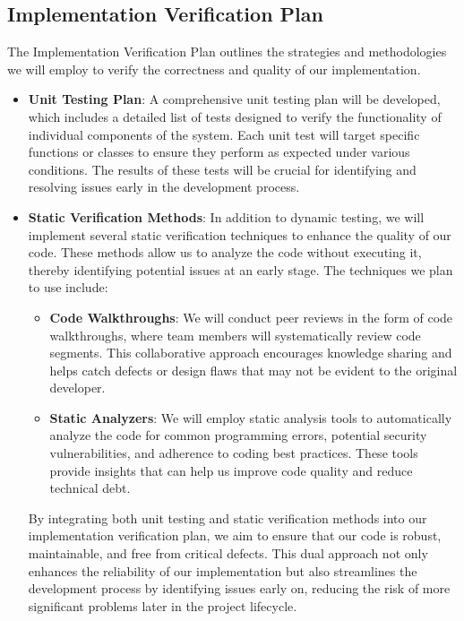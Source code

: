 \documentclass[12pt, titlepage]{article}
\begin{document}
\subsection{Implementation Verification Plan}


The Implementation Verification Plan outlines the strategies and methodologies we will employ to verify the correctness and quality of our implementation.

\begin{itemize}
    \item \textbf{Unit Testing Plan}: A comprehensive unit testing plan will be developed, which includes a detailed list of tests designed to verify the functionality of individual components of the system. Each unit test will target specific functions or classes to ensure they perform as expected under various conditions. The results of these tests will be crucial for identifying and resolving issues early in the development process.

    \item \textbf{Static Verification Methods}: In addition to dynamic testing, we will implement several static verification techniques to enhance the quality of our code. These methods allow us to analyze the code without executing it, thereby identifying potential issues at an early stage. The techniques we plan to use include:
    \begin{itemize}
        \item \textbf{Code Walkthroughs}: We will conduct peer reviews in the form of code walkthroughs, where team members will systematically review code segments. This collaborative approach encourages knowledge sharing and helps catch defects or design flaws that may not be evident to the original developer.
        \item \textbf{Static Analyzers}: We will employ static analysis tools to automatically analyze the code for common programming errors, potential security vulnerabilities, and adherence to coding best practices. These tools provide insights that can help us improve code quality and reduce technical debt.
    \end{itemize}

    By integrating both unit testing and static verification methods into our implementation verification plan, we aim to ensure that our code is robust, maintainable, and free from critical defects. This dual approach not only enhances the reliability of our implementation but also streamlines the development process by identifying issues early on, reducing the risk of more significant problems later in the project lifecycle.
\end{itemize}
\end{document}
